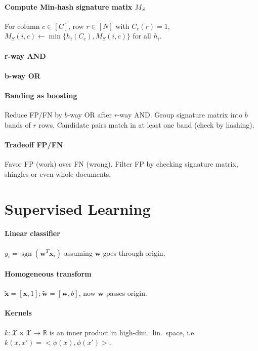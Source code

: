 \documentclass[9pt]{scrartcl}
\DeclareMathOperator{\sign}{sgn}
\newcommand{\R}{\mathbb{R}}
\begin{document}
\begin{twocolumn}
\paragraph{Compute Min-hash signature matix $M_S$}
For column $c \in [C]$, row $r \in [N]$ with $C_c(r) = 1$, $M_S(i,c) \leftarrow \min\{h_i(C_c), M_S(i,c)\}$ for all $h_i$.

\paragraph{r-way AND}
\paragraph{b-way OR}

\paragraph{Banding as boosting}
Reduce FP/FN by $b$-way OR after $r$-way AND.
Group signature matrix into $b$ bands of $r$ rows.
Candidate pairs match in at least one band (check by hashing).

\paragraph{Tradeoff FP/FN}
Favor FP (work) over FN (wrong).
Filter FP by checking signature matrix, shingles or even whole documents.


\section{Supervised Learning}
\paragraph{Linear classifier} $y_i = \sign(\bm w^T\bm x_i)$ assuming $\bm w$ goes through origin.
\paragraph{Homogeneous transform} $\tilde{\bm x} = [\bm x, 1]; \tilde{\bm w} = [\bm w, b]$, now $\bm w$ passes origin.
\paragraph{Kernels}
$k: \mathcal{X}\times\mathcal{X} \rightarrow \R$ is an inner product in high-dim.\ lin.\ space, i.e.\ $k(x,x') = <\phi(x),\phi(x')>$.


\end{twocolumn}
\end{document}

